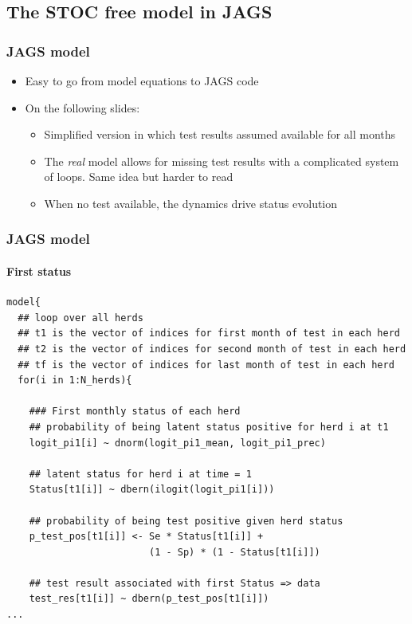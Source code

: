 \documentclass{beamer}
\begin{document}
\subsection[JAGS]{The STOC free model in JAGS}

\begin{frame}
\frametitle{JAGS model}
\begin{itemize}
 \item{Easy to go from model equations to JAGS code}
 \item{On the following slides:}
 \begin{itemize}
  \item{Simplified version in which test results assumed available for all months}
  \item{The \emph{real} model allows for missing test results with a complicated system of loops. Same idea but harder to read}
  \item{When no test available, the dynamics drive status evolution}
 \end{itemize}
\end{itemize}
\end{frame}








\begin{frame}[fragile]
\frametitle{JAGS model}
\framesubtitle{First status}
\scriptsize
\begin{verbatim}
model{
  ## loop over all herds
  ## t1 is the vector of indices for first month of test in each herd
  ## t2 is the vector of indices for second month of test in each herd
  ## tf is the vector of indices for last month of test in each herd
  for(i in 1:N_herds){
    
    ### First monthly status of each herd
    ## probability of being latent status positive for herd i at t1
    logit_pi1[i] ~ dnorm(logit_pi1_mean, logit_pi1_prec)
    
    ## latent status for herd i at time = 1
    Status[t1[i]] ~ dbern(ilogit(logit_pi1[i]))
  
    ## probability of being test positive given herd status
    p_test_pos[t1[i]] <- Se * Status[t1[i]] + 
                         (1 - Sp) * (1 - Status[t1[i]])
    
    ## test result associated with first Status => data
    test_res[t1[i]] ~ dbern(p_test_pos[t1[i]])
...    
\end{verbatim}
\end{frame}
\end{document}

